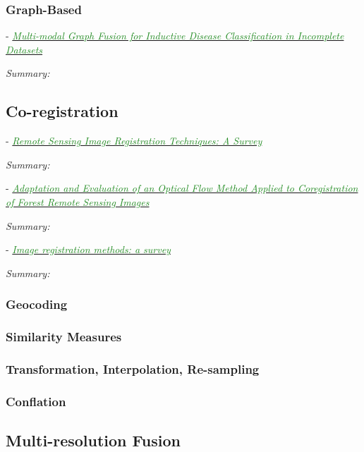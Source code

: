 \documentclass[]{article}
\newcommand{\paperentry}[4]{
            \hangindent=1cm
            \cite{#1} - \href{run:../References/#3}{\textcolor{ForestGreen}{\textit{#2}}}
            
            \noindent            
            \begin{minipage}[t]{0.1\linewidth}\hfill\end{minipage}
            \begin{minipage}[t]{0.8\linewidth}\textcolor{NavyBlue}{{\textit{Summary:}}}#4\end{minipage}
            \vspace{.25cm}
          }
\begin{document}
		\subsubsection{Graph-Based}
		
			\paperentry{Vivar2019MultiModalGraphFusion}
			{Multi-modal Graph Fusion for Inductive Disease Classification in Incomplete Datasets}
			{Fusion/GraphBased/Vivar2019MultiModalGraphFusion.pdf}
			{}

	\subsection{Co-registration}
	
		\paperentry{Dawn2010SurveyRemoteSensingImageRegistration}
		{Remote Sensing Image Registration Techniques: A Survey}
		{Fusion/Dawn2010SurveyRemoteSensingImageRegistration.pdf}
		{}
	
		\paperentry{Brigot2016CoregistrationForestRemoteSensingImages}
		{Adaptation and Evaluation of an Optical Flow Method Applied to Coregistration of Forest Remote Sensing Images}
		{Fusion/Brigot2016CoregistrationForestRemoteSensingImages.pdf}
		{}
		
		\paperentry{Zitova2003SurveyImageRegistrationMethods}
		{Image registration methods: a survey}
		{Fusion/Reviews/Zitova2003SurveyImageRegistrationMethods.pdf}
		{}
	
		\subsubsection{Geocoding}
	
		\subsubsection{Similarity Measures}
	
		\subsubsection{Transformation, Interpolation, Re-sampling}
	
		\subsubsection{Conflation}
		
	\subsection{Multi-resolution Fusion}
	
\end{document}
